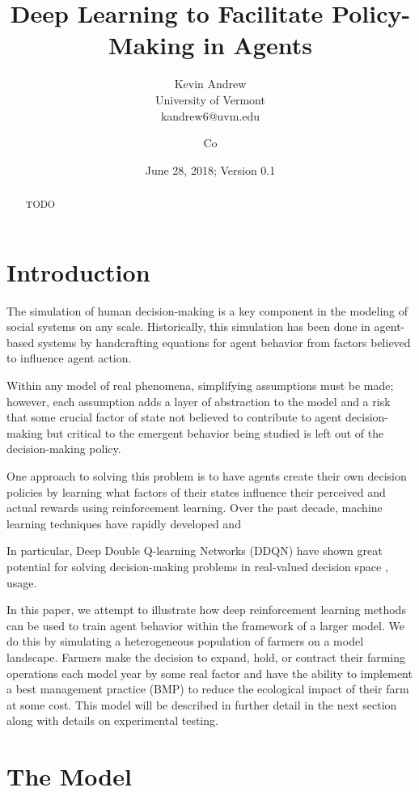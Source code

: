 \documentclass[12pt]{article}
\title{Deep Learning to Facilitate Policy-Making in Agents}
\author{Kevin Andrew \\
		University of Vermont\\
		kandrew6@uvm.edu
		\and Co
}
\date{June 28, 2018; Version 0.1}
\begin{document}
\maketitle

\begin{abstract}
TODO
\end{abstract}

\section{Introduction}

The simulation of human decision-making is a key component in the
modeling of social systems on any scale.
Historically, this simulation has been done in agent-based systems
by handcrafting equations for agent behavior from factors believed
to influence agent action.

Within any model of real phenomena, simplifying assumptions must be made;
however, each assumption adds a layer of abstraction to the model
and a risk that some crucial factor of state not believed to contribute
to agent decision-making but critical to the emergent behavior being
studied is left out of the decision-making policy.

One approach to solving this problem is to have agents create
their own decision policies by learning what factors of their
states influence their perceived and actual rewards using
reinforcement learning.
Over the past decade, machine learning techniques have rapidly
developed and

In particular, Deep Double Q-learning Networks (DDQN) have shown
great potential for solving decision-making problems in real-valued
decision space \cite{lillicrap15}, usage.

In this paper, we attempt to illustrate how deep reinforcement learning
methods can be used to train agent behavior within the framework of
a larger model.
We do this by simulating a heterogeneous population of farmers on a model
landscape.
Farmers make the decision to expand, hold, or contract their farming
operations each model year by some real factor and have the ability to
implement a best management practice (BMP) to reduce the ecological impact
of their farm at some cost.
This model will be described in further detail in the next section along
with details on experimental testing.

\section{The Model}
\end{document}
